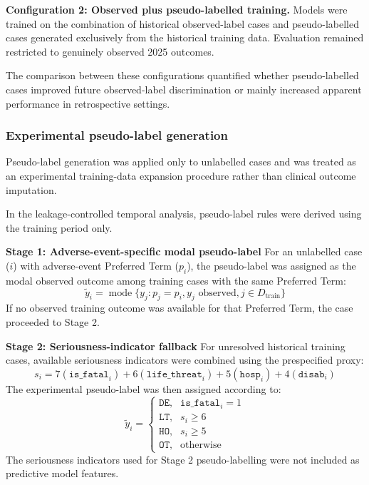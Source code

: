 \documentclass[10pt]{article}
\begin{document}
\textbf{Configuration 2: Observed plus pseudo-labelled training.}
Models were trained on the combination of historical observed-label cases and pseudo-labelled cases generated exclusively from the historical training data. Evaluation remained restricted to genuinely observed 2025 outcomes.

The comparison between these configurations quantified whether pseudo-labelled cases improved future observed-label discrimination or mainly increased apparent performance in retrospective settings.

\subsubsection{Experimental pseudo-label generation}
\label{sec:imputation}
Pseudo-label generation was applied only to unlabelled cases and was treated as an experimental training-data expansion procedure rather than clinical outcome imputation.

In the leakage-controlled temporal analysis, pseudo-label rules were derived using the training period only.

\textbf{Stage 1: Adverse-event-specific modal pseudo-label}
For an unlabelled case ($i$) with adverse-event Preferred Term ($p_i$), the pseudo-label was assigned as the modal observed outcome among training cases with the same Preferred Term:
\begin{equation}
\tilde{y}_i = \operatorname{mode}\{y_j : p_j=p_i, y_j \text{ observed}, j \in D_{\text{train}}\}
\end{equation}
If no observed training outcome was available for that Preferred Term, the case proceeded to Stage 2.

\textbf{Stage 2: Seriousness-indicator fallback}
For unresolved historical training cases, available seriousness indicators were combined using the prespecified proxy:
\begin{equation}
s_i = 7(\texttt{is\_fatal}_i) + 6(\texttt{life\_threat}_i) + 5(\texttt{hosp}_i) + 4(\texttt{disab}_i)
\end{equation}
The experimental pseudo-label was then assigned according to:
\begin{equation}
\tilde{y}_i = \begin{cases}
\texttt{DE}, & \texttt{is\_fatal}_i = 1 \\
\texttt{LT}, & s_i \geq 6 \\
\texttt{HO}, & s_i \geq 5 \\
\texttt{OT}, & \text{otherwise}
\end{cases}
\end{equation}
The seriousness indicators used for Stage 2 pseudo-labelling were not included as predictive model features.
\end{document}
